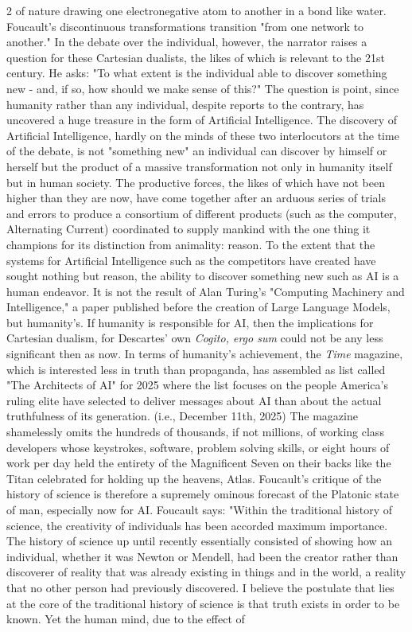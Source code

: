 \documentclass[10pt,a4paper,twoside]{article} %
\begin{document}
\begin{multicols}{2}
{of nature drawing one electronegative atom to another in a bond like water. Foucault's discontinuous transformations transition "from one network to another." \newline \indent In the debate over the individual, however, the narrator raises a question for these Cartesian dualists, the likes of which is relevant to the 21st century. He asks: "To what extent is the individual able to discover something new - and, if so, how should we make sense of this?" The question is point, since humanity rather than any individual, despite reports to the contrary, has uncovered a huge treasure in the form of Artificial Intelligence. The discovery of Artificial Intelligence, hardly on the minds of these two interlocutors at the time of the debate, is not "something new" an individual can discover by himself or herself but the product of a massive transformation not only in humanity itself but in human society. The productive forces, the likes of which have not been higher than they are now, have come together after an arduous series of trials and errors to produce a consortium of different products (such as the computer, Alternating Current) coordinated to supply mankind with the one thing it champions for its distinction from animality: reason. To the extent that the systems for Artificial Intelligence such as the competitors have created have sought nothing but reason, the ability to discover something new such as AI is a human endeavor. It is not the result of Alan Turing's "Computing Machinery and Intelligence," a paper published before the creation of Large Language Models, but humanity's. If humanity is responsible for AI, then the implications for Cartesian dualism, for Descartes' own \emph{Cogito, ergo sum} could not be any less significant then as now. In terms of humanity's achievement, the \emph{Time} magazine, which is interested less in truth than propaganda, has assembled as list called "The Architects of AI" for 2025 where the list focuses on the people America's ruling elite have selected to deliver messages about AI than about the actual truthfulness of its generation. (i.e., December 11th, 2025) The magazine shamelessly omits the hundreds of thousands, if not millions, of working class developers whose keystrokes, software, problem solving skills, or eight hours of work per day held the entirety of the Magnificent Seven on their backs like the Titan celebrated for holding up the heavens, Atlas. \newline \indent Foucault's critique of the history of science is therefore a supremely ominous forecast of the Platonic state of man, especially now for AI. Foucault says: "Within the traditional history of science, the creativity of individuals has been accorded maximum importance. The history of science up until recently essentially consisted of showing how an individual, whether it was Newton or Mendell, had been the creator rather than discoverer of reality that was already existing in things and in the world, a reality that no other person had previously discovered. I believe the postulate that lies at the core of the traditional history of science is that truth exists in order to be known. Yet the human mind, due to the effect of }
\end{multicols}
\end{document}
